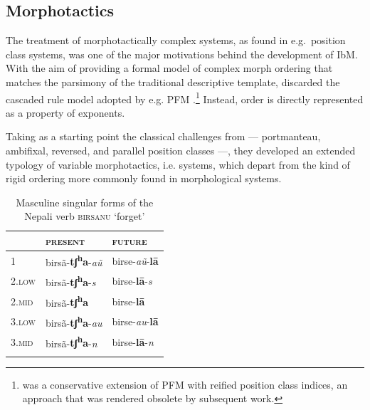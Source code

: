 \documentclass[output=paper
	        ,collection
	        ,collectionchapter
 	        ,biblatex
                ,babelshorthands
                ,newtxmath
                ,draftmode
                ,colorlinks, citecolor=brown
]{langscibook}
\begin{document}
\begin{exe}
\begin{xlist}
\begin{exe}
\begin{xlist}
\subsection{Morphotactics}
\label{sec:Mortax}

The treatment of morphotactically complex systems, as found in e.g.\
position class systems, was one of the major motivations behind the
development of IbM. With the aim of providing a formal model of
complex morph ordering that matches the parsimony of the traditional
descriptive template, \citet{Crysmann:Bonami:2016} discarded the
cascaded rule model adopted by e.g. PFM
\citep{Stump01}.\footnote{\citet{Crysmann12} was a conservative
  extension of PFM with reified position class indices, an approach
  that was rendered obsolete by subsequent work.} Instead, order is
directly represented as a property of exponents.

Taking as a starting point the classical challenges from
\citet{Stump93} --- portmanteau, ambifixal, reversed, and parallel
position classes ---, they developed an extended typology of variable
morphotactics, i.e. systems, which depart from the kind of rigid
ordering more commonly found in morphological systems.

\begin{table}[ht!]
  \begin{center}
    \begin{tabular}{lll}
      \lsptoprule
      & \textsc{present} & \textsc{future}\\
      \midrule
      1 & birsã-\textbf{tʃ\textsuperscript{h}a}-\emph{aũ} & 
                                                                birse-\emph{aũ}-\textbf{lā}\\
      \textsc{2.low} &
                 birsã-\textbf{tʃ\textsuperscript{h}a}-\emph{s} & 
                                                                      birse-\textbf{lā}-\emph{s}\\
      \textsc{2.mid} & 
                  birsã-\textbf{tʃ\textsuperscript{h}a} & 
                                                         birse-\textbf{lā}\\
      \textsc{3.low} & 
                  birsã-\textbf{tʃ\textsuperscript{h}a}-\emph{au} & 
                                                                        birse-\emph{au}-\textbf{lā}\\
      \textsc{3.mid} &
                 birsã-\textbf{tʃ\textsuperscript{h}a}-\emph{n} & 
                                                                      birse-\textbf{lā}-\emph{n}\\
      \lspbottomrule
    \end{tabular}
  \end{center}
  \caption{Masculine singular forms of the Nepali verb \textsc{birsanu} ‘forget’}
  \label{tab:Nepali}
\end{table}


\end{xlist}
\end{exe}
\end{xlist}
\end{exe}
\end{document}
